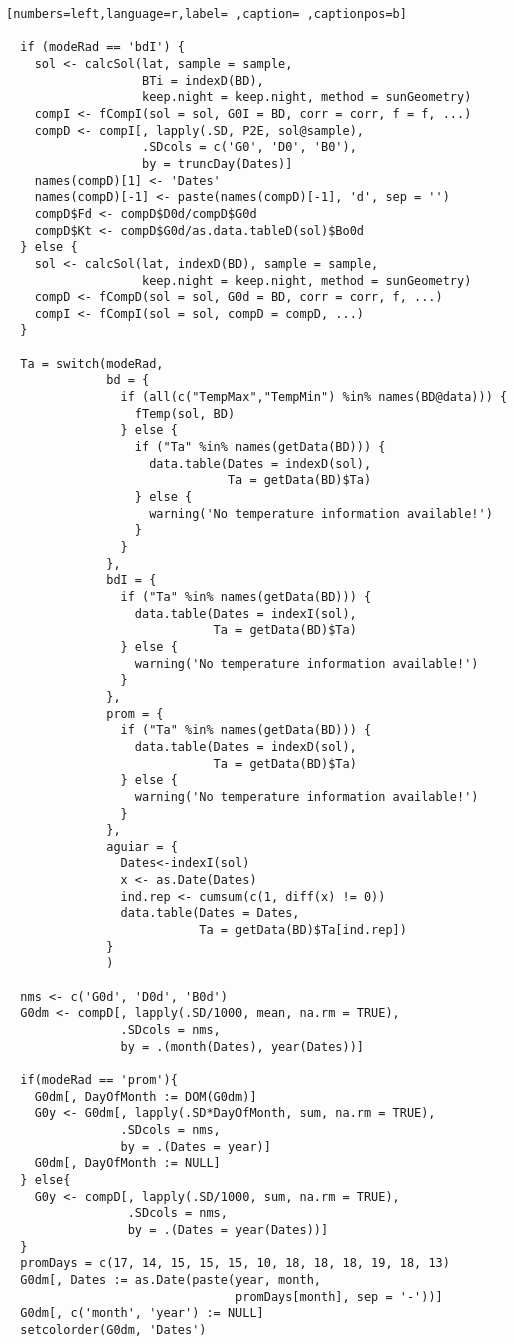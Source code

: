\begin{lstlisting}[numbers=left,language=r,label= ,caption= ,captionpos=b]
  
  if (modeRad == 'bdI') {
    sol <- calcSol(lat, sample = sample,
                   BTi = indexD(BD),
                   keep.night = keep.night, method = sunGeometry)
    compI <- fCompI(sol = sol, G0I = BD, corr = corr, f = f, ...)
    compD <- compI[, lapply(.SD, P2E, sol@sample),
                   .SDcols = c('G0', 'D0', 'B0'),
                   by = truncDay(Dates)]
    names(compD)[1] <- 'Dates'
    names(compD)[-1] <- paste(names(compD)[-1], 'd', sep = '')
    compD$Fd <- compD$D0d/compD$G0d
    compD$Kt <- compD$G0d/as.data.tableD(sol)$Bo0d
  } else { 
    sol <- calcSol(lat, indexD(BD), sample = sample,
                   keep.night = keep.night, method = sunGeometry)
    compD <- fCompD(sol = sol, G0d = BD, corr = corr, f, ...)
    compI <- fCompI(sol = sol, compD = compD, ...)
  }
  
  Ta = switch(modeRad,
              bd = {
                if (all(c("TempMax","TempMin") %in% names(BD@data))) {
                  fTemp(sol, BD)
                } else {
                  if ("Ta" %in% names(getData(BD))) {
                    data.table(Dates = indexD(sol),
                               Ta = getData(BD)$Ta)
                  } else {
                    warning('No temperature information available!')
                  }
                }
              },
              bdI = {
                if ("Ta" %in% names(getData(BD))) {
                  data.table(Dates = indexI(sol),
                             Ta = getData(BD)$Ta)
                } else {
                  warning('No temperature information available!')
                }
              },
              prom = {
                if ("Ta" %in% names(getData(BD))) {
                  data.table(Dates = indexD(sol),
                             Ta = getData(BD)$Ta)
                } else {
                  warning('No temperature information available!')
                }                  
              },
              aguiar = {
                Dates<-indexI(sol)	
                x <- as.Date(Dates)
                ind.rep <- cumsum(c(1, diff(x) != 0))
                data.table(Dates = Dates,
                           Ta = getData(BD)$Ta[ind.rep])
              }
              )
  
  nms <- c('G0d', 'D0d', 'B0d')
  G0dm <- compD[, lapply(.SD/1000, mean, na.rm = TRUE),
                .SDcols = nms,
                by = .(month(Dates), year(Dates))]
  
  if(modeRad == 'prom'){
    G0dm[, DayOfMonth := DOM(G0dm)]
    G0y <- G0dm[, lapply(.SD*DayOfMonth, sum, na.rm = TRUE),
                .SDcols = nms,
                by = .(Dates = year)]
    G0dm[, DayOfMonth := NULL]        
  } else{
    G0y <- compD[, lapply(.SD/1000, sum, na.rm = TRUE),
                 .SDcols = nms,
                 by = .(Dates = year(Dates))]
  }
  promDays = c(17, 14, 15, 15, 15, 10, 18, 18, 18, 19, 18, 13)
  G0dm[, Dates := as.Date(paste(year, month,
                                promDays[month], sep = '-'))]
  G0dm[, c('month', 'year') := NULL]
  setcolorder(G0dm, 'Dates')
  

\end{lstlisting}
